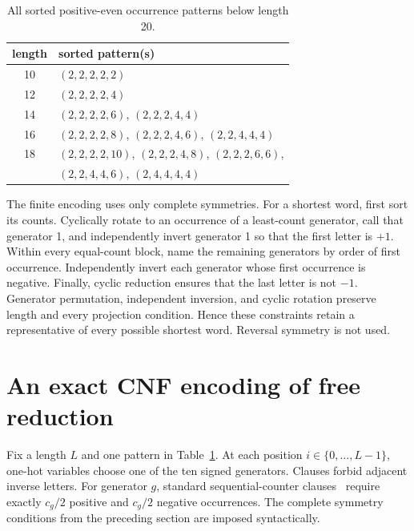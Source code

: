 \documentclass[11pt]{article}
\begin{document}
\begin{table}[ht]
\centering
\caption{All sorted positive-even occurrence patterns below length 20.}
\label{tab:patterns}
\begin{tabular}{c@{\qquad}l}
\toprule
length & sorted pattern(s)\\
\midrule
10 & \((2,2,2,2,2)\)\\
12 & \((2,2,2,2,4)\)\\
14 & \((2,2,2,2,6)\), \((2,2,2,4,4)\)\\
16 & \((2,2,2,2,8)\), \((2,2,2,4,6)\), \((2,2,4,4,4)\)\\
18 & \((2,2,2,2,10)\), \((2,2,2,4,8)\), \((2,2,2,6,6)\),\\
   & \((2,2,4,4,6)\), \((2,4,4,4,4)\)\\
\bottomrule
\end{tabular}
\end{table}

The finite encoding uses only complete symmetries.  For a shortest word, first
sort its counts.  Cyclically rotate to an occurrence of a least-count
generator, call that generator 1, and independently invert generator 1 so
that the first letter is \(+1\).  Within every equal-count block, name the
remaining generators by order of first occurrence.  Independently invert each
generator whose first occurrence is negative.  Finally, cyclic reduction
ensures that the last letter is not \(-1\).  Generator permutation,
independent inversion, and cyclic rotation preserve length and every
projection condition.  Hence these constraints retain a representative of
every possible shortest word.  Reversal symmetry is not used.

\section{An exact CNF encoding of free reduction}

Fix a length \(L\) and one pattern in Table~\ref{tab:patterns}.  At each
position \(i\in\{0,\ldots,L-1\}\), one-hot variables choose one of the ten
signed generators.  Clauses forbid adjacent inverse letters.  For generator
\(g\), standard sequential-counter clauses~\cite{Sinz2005} require exactly
\(c_g/2\) positive and \(c_g/2\) negative occurrences.  The complete symmetry
conditions from the preceding section are imposed syntactically.
\end{document}
